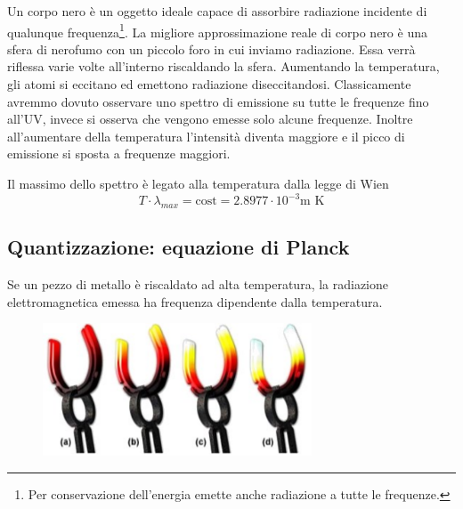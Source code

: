 Un corpo nero è un oggetto ideale capace di assorbire radiazione incidente di qualunque frequenza\footnote{Per conservazione dell'energia emette anche radiazione a tutte le frequenze.}. La migliore approssimazione reale di corpo nero è una sfera di nerofumo con un piccolo foro in cui inviamo radiazione. Essa verrà riflessa varie volte all'interno riscaldando la sfera. Aumentando la temperatura, gli atomi si eccitano ed emettono radiazione diseccitandosi. Classicamente avremmo dovuto osservare uno spettro di emissione su tutte le frequenze fino all'UV, invece si osserva che vengono emesse solo alcune frequenze. Inoltre all'aumentare della temperatura l'intensità diventa maggiore e il picco di emissione si sposta a frequenze maggiori. 

Il massimo dello spettro è legato alla temperatura dalla legge di Wien 
$$T\cdot\lambda_{max}= \text{cost}= 2.8977\cdot 10^{-3} \text{m K}$$


\subsection{Quantizzazione: equazione di Planck}%
Se un pezzo di metallo è riscaldato ad alta temperatura, la radiazione elettromagnetica emessa ha frequenza dipendente dalla temperatura. 

\begin{figure}[htp]
  \centering
  \includegraphics[width=8cm]{immagini/ferro_incandescente.png}
\end{figure}

